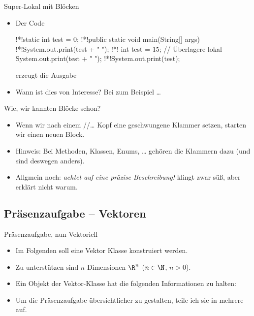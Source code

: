 \begin{frame}[t,fragile]{Super-Lokal mit Blöcken}
    \begin{itemize}[<+(1)->]
        \item Der Code
{\begin{plainjava}
!*\pause*!static int test = 0;
!*\pause*!public static void main(String[] args) {
    !*\pause*!System.out.print(test + " ");
    !*\pause*!{
        int test = 15; // Überlagere lokal
        System.out.print(test + " ");
    }
    !*\pause*!System.out.print(test);
}
\end{plainjava}}
        \pause{}erzeugt die Ausgabe 
        \item Wann ist dies von Interesse?\pause{} Bei  zum Beispiel \ldots
    \end{itemize}
\end{frame}

\begin{frame}[t,fragile]{Wie, wir kannten Blöcke schon?}
    \begin{itemize}[<+(1)->]
        \item Wenn wir nach einem //\ldots{} Kopf eine geschwungene Klammer setzen,\pause{} starten wir einen neuen Block.
        \item Hinweis: Bei Methoden, Klassen, Enums, \ldots{} gehören die Klammern dazu (und sind deswegen anders).
        \item Allgmein noch: \pause{}\textit{achtet auf eine präzise Beschreibung!}\pause{}  klingt zwar süß,\pause{} aber erklärt nicht warum.
    \end{itemize}
\end{frame}

\subsection{Präsenzaufgabe -- Vektoren}
\begin{frame}{Präsenzaufgabe, nun Vektoriell}
    \begin{itemize}[<+(1)->]
        \item Im Folgenden soll eine Vektor Klasse konstruiert werden.
        \item Zu unterstützen sind \(n\) Dimensionen \(\R^n\) (\(n \in \N\), \(n > 0\)).
        \item Ein Objekt der Vektor-Klasse hat die folgenden Informationen zu halten:
        \item Um die Präsenzaufgabe übersichtlicher zu gestalten, teile ich sie in mehrere auf.
    \end{itemize}
\end{frame}

